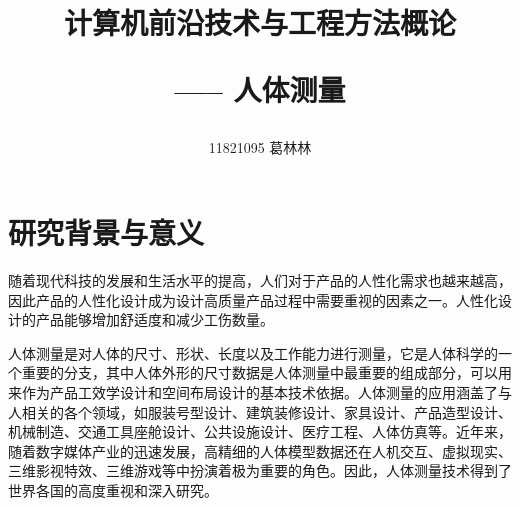 \documentclass[10pt]{article}
\title{计算机前沿技术与工程方法概论 \hspace{2pt}\hspace{2pt} \begin{large}----- \hspace{2pt} 人体测量 \end{large} }
\author{11821095 葛林林}
\begin{document}
\maketitle
\section{研究背景与意义}
随着现代科技的发展和生活水平的提高，人们对于产品的人性化需求也越来越高，因此产品的人性化设计成为设计高质量产品过程中需要重视的因素之一。人性化设计的产品能够增加舒适度和减少工伤数量。
\par 人体测量是对人体的尺寸、形状、长度以及工作能力进行测量，它是人体科学的一个重要的分支，其中人体外形的尺寸数据是人体测量中最重要的组成部分，可以用来作为产品工效学设计和空间布局设计的基本技术依据。人体测量的应用涵盖了与人相关的各个领域，如服装号型设计、建筑装修设计、家具设计、产品造型设计、机械制造、交通工具座舱设计、公共设施设计、医疗工程、人体仿真等。近年来，随着数字媒体产业的迅速发展，高精细的人体模型数据还在人机交互、虚拟现实、三维影视特效、三维游戏等中扮演着极为重要的角色。因此，人体测量技术得到了世界各国的高度重视和深入研究。
\newpage
\end{document}
